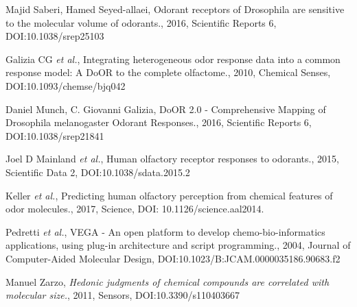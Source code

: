 \documentclass[a1paper,fontscale=0.5]{baposter} %
\newcommand{\compresslist}{ %
\setlength{\itemsep}{1pt}
\setlength{\parskip}{0pt}
\setlength{\parsep}{0pt}
}
\begin{document}
\begin{poster}
{\begin{thebibliography}{1}
   Majid Saberi, Hamed Seyed-allaei, {
  Odorant receptors of Drosophila are sensitive to the molecular volume of odorants.}, 
  2016, Scientific Reports 6, DOI:10.1038/srep25103

   Galizia CG {\em et al.}, { Integrating heterogeneous odor response data into a common response model: A DoOR to the complete olfactome.}, 2010, Chemical Senses, DOI:10.1093/chemse/bjq042

  Daniel Munch, C. Giovanni Galizia, {
DoOR 2.0 - Comprehensive Mapping of Drosophila melanogaster Odorant Responses.},
2016, Scientific Reports 6, DOI:10.1038/srep21841

   Joel D Mainland {\em et al.}, {
Human olfactory receptor responses to odorants.},
2015, Scientific Data 2, DOI:10.1038/sdata.2015.2

   Keller {\em et al.}, {
 Predicting human olfactory perception from chemical features of odor molecules.},
2017, Science, DOI: 10.1126/science.aal2014. 


   Pedretti {\em et al.}, { VEGA - An open platform to develop chemo-bio-informatics applications, using plug-in architecture and script programming.}, 2004, Journal of Computer-Aided Molecular Design, DOI:10.1023/B:JCAM.0000035186.90683.f2

  Manuel Zarzo, {\em Hedonic judgments of chemical compounds are correlated with molecular size.}, 2011, Sensors, DOI:10.3390/s110403667

  \end{thebibliography}
}





\end{poster}
\end{document}
